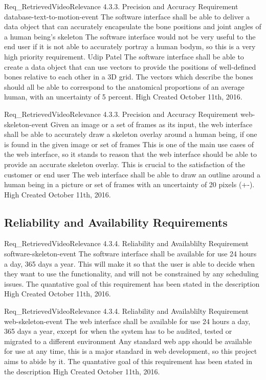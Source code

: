 \documentclass{scrreprt}
\begin{document}
\requirement
{Req_RetrievedVideoRelevance}
{4.3.3. Precision and Accuracy Requirement}
{database-text-to-motion-event}
{The software interface shall be able to deliver a data object that can accurately encapsulate the bone positions and joint angles of a human being's skeleton}
{The software interface would not be very useful to the end user if it is not able to accurately portray a human bodym, so this is a very high priority requirement.}
{Udip Patel}
{The software interface shall be able to create a data object that can use vectors to provide the positions of well-defined bones relative to each other in a 3D grid. The vectors which describe the bones should all be able to correspond to the anatomical proportions of an average human, with an uncertainty of 5 percent.}
{High}
{Created October 11th, 2016.}

\requirement
{Req_RetrievedVideoRelevance}
{4.3.3. Precision and Accuracy Requirement}
{web-skeleton-event}
{Given an image or a set of frames as its input, the web interface shall be able to accurately draw a skeleton overlay around a human being, if one is found in the given image or set of frames}
{This is one of the main use cases of the web interface, so it stands to reason that the web interface should be able to provide an accurate skeleton overlay. This is crucial to the satisfaction of the customer or end user }
{The web interface shall be able to draw an outline around a human being in a picture or set of frames with an uncertainty of 20 pixels (+-).}
{High}
{Created October 11th, 2016.}

\subsection{Reliability and Availability Requirements}

\requirement
{Req_RetrievedVideoRelevance}
{4.3.4. Reliability and Availablilty Requirement}
{software-skeleton-event}
{The software interface shall be available for use 24 hours a day, 365 days a year.}
{This will make it so that the user is able to decide when they want to use the functionality, and will not be constrained by any scheduling issues.}
{The quantative goal of this requirement has been stated in the description}
{High}
{Created October 11th, 2016.}

\requirement
{Req_RetrievedVideoRelevance}
{4.3.4. Reliability and Availablilty Requirement}
{web-skeleton-event}
{The web interface shall be available for use 24 hours a day, 365 days a year, except for when the system has to be audited, tested or migrated to a different environment}
{Any standard web app should be available for use at any time, this is a major standard in web development, so this project aims to abide by it.}
{The quantative goal of this requirement has been stated in the description}
{High}
{Created October 11th, 2016.}
\end{document}
